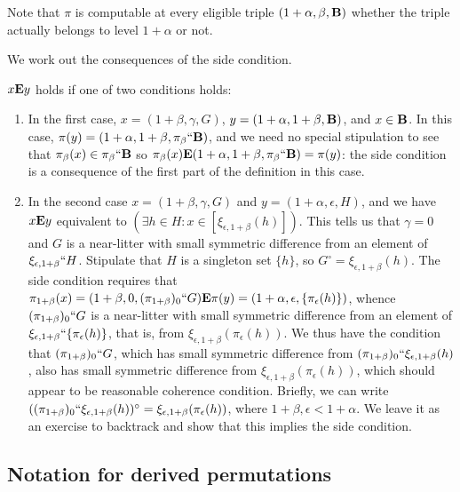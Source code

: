 \documentclass[12pt]{article}
\begin{document}
Note that $\pi$ is computable at every eligible triple $(1+\alpha,\beta,{\bf B})$ whether the triple actually belongs to level $1+\alpha$ or not.

We work out the consequences of the side condition.

$x {\bf E} y$ holds if one of two conditions holds:

\begin{enumerate}

\item  In the first case, $x=(1+\beta,\gamma,G)$, $y = (1+\alpha,1+\beta,{\bf B})$, and $x \in {\bf B}$.  In this case, $\pi(y) = (1+\alpha,1+\beta,\pi_\beta``{\bf B})$,
and we need no special stipulation to see that $\pi_{\beta}(x) \in \pi_{\beta}``{\bf B}$ so $\pi_\beta(x) {\bf E}  (1+\alpha,1+\beta,\pi_\beta``{\bf B}) = \pi(y)$:  the side condition is a consequence of the first part of the definition in this case.

\item  In the second case $x=(1+\beta,\gamma,G)$ and $y=(1+\alpha,\epsilon,H)$, and we have $x {\bf E} y$ equivalent to $(\exists h \in H:x \in [\xi_{\epsilon,1+\beta}(h)])$.
This tells us that $\gamma=0$ and $G$ is a near-litter with small symmetric difference from an element of $\xi_{\epsilon,1+\beta}``H$.  Stipulate that $H$ is a singleton set
$\{h\}$, so $G^{\circ} = \xi_{\epsilon,1+\beta}(h)$.   The side condition requires that $\pi_{1+\beta}(x) = (1+\beta,0,(\pi_{1+\beta})_0``G) {\bf E} \pi(y) = (1+\alpha,\epsilon,\{\pi_\epsilon(h)\})$, whence
$(\pi_{1+\beta})_0``G$ is a near-litter with small symmetric difference from an element of $\xi_{\epsilon,1+\beta}``\{\pi_\epsilon(h)\}$, that is, from $\xi_{\epsilon,1+\beta}(\pi_\epsilon(h))$.   We thus have the condition that  $(\pi_{1+\beta})_0``G$, which has small symmetric difference from $(\pi_{1+\beta})_0``\xi_{\epsilon,1+\beta}(h)$, also  has small symmetric difference from  $\xi_{\epsilon,1+\beta}(\pi_\epsilon(h))$, which should appear to be reasonable coherence condition.  Briefly, we can write  $((\pi_{1+\beta})_0``\xi_{\epsilon,1+\beta}(h))^{\circ}=\xi_{\epsilon,1+\beta}(\pi_\epsilon(h))$, where $1+\beta, \epsilon <1+\alpha$.  We leave it as an exercise to backtrack and show that this implies the side condition.

\end{enumerate}

\subsection{Notation for derived permutations}
\end{document}
